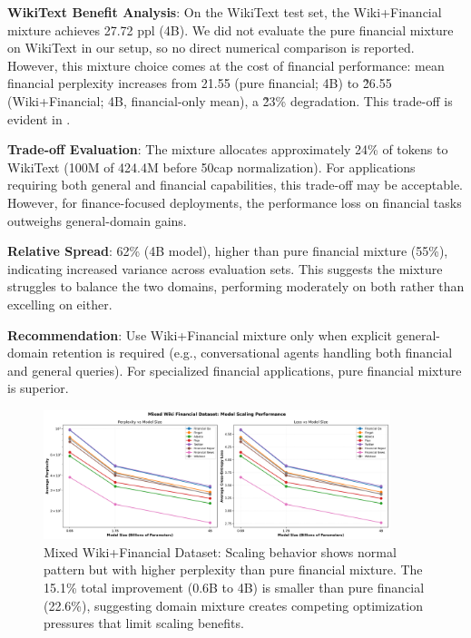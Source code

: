 \textbf{WikiText Benefit Analysis}: On the WikiText test set, the Wiki+Financial mixture achieves 27.72 ppl (4B). We did not evaluate the pure financial mixture on WikiText in our setup, so no direct numerical comparison is reported. However, this mixture choice comes at the cost of financial performance: mean financial perplexity increases from 21.55 (pure financial; 4B) to \~26.55 (Wiki+Financial; 4B, financial-only mean), a \~23\% degradation. This trade-off is evident in .

\textbf{Trade-off Evaluation}: The mixture allocates approximately 24\% of tokens to WikiText (100M of 424.4M before 50cap normalization). For applications requiring both general and financial capabilities, this trade-off may be acceptable. However, for finance-focused deployments, the performance loss on financial tasks outweighs general-domain gains.

\textbf{Relative Spread}: 62\% (4B model), higher than pure financial mixture (55\%), indicating increased variance across evaluation sets. This suggests the mixture struggles to balance the two domains, performing moderately on both rather than excelling on either.

\textbf{Recommendation}: Use Wiki+Financial mixture only when explicit general-domain retention is required (e.g., conversational agents handling both financial and general queries). For specialized financial applications, pure financial mixture is superior.

\begin{figure}[h]
\centering
\includegraphics[width=0.9\textwidth]{figures/scaling_mixed_wiki_financial.png}
\caption[Mixed Wiki+Financial Dataset: Scaling Behavior]{Mixed Wiki+Financial Dataset: Scaling behavior shows normal pattern but with higher perplexity than pure financial mixture. The 15.1\% total improvement (0.6B to 4B) is smaller than pure financial (22.6\%), suggesting domain mixture creates competing optimization pressures that limit scaling benefits.}
\label{fig:scaling_mixed_wiki_financial}
\end{figure}

